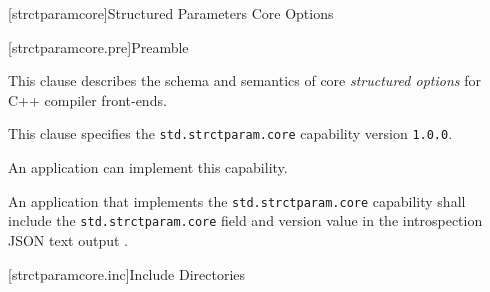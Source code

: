 
[strctparamcore]{Structured Parameters Core Options}


[strctparamcore.pre]{Preamble}

\pnum
This clause describes the schema and semantics of core \emph{structured options}
 for C++ compiler front-ends.

\pnum
This clause specifies the \verb|std.strctparam.core| capability 
 version \verb|1.0.0|.

\pnum
An application can implement this capability.

\pnum
An application that implements the \verb|std.strctparam.core| capability shall
include the \verb|std.strctparam.core| field and version value in the 
introspection JSON text output .

[strctparamcore.inc]{Include Directories}
